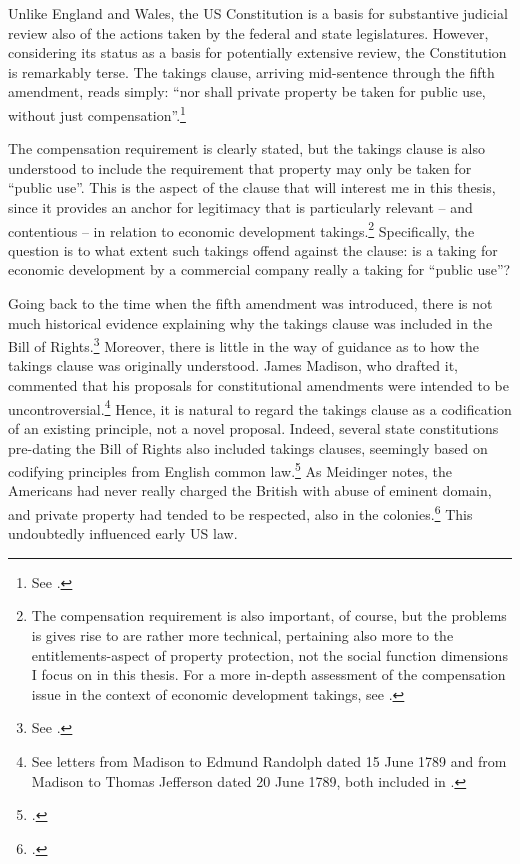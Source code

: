 Unlike England and Wales, the US Constitution is a basis for substantive judicial review also of the actions taken by the federal and state legislatures. However, considering its status as a basis for potentially extensive review, the Constitution is remarkably terse. The takings clause, arriving mid-sentence through the fifth amendment, reads simply: ``nor shall private property be taken for public use, without just compensation''.\footnote{See \cite{us}.}

The compensation requirement is clearly stated, but the takings clause is also understood to include the requirement that property may only be taken for ``public use''. This is the aspect of the clause that will interest me in this thesis, since it provides an anchor for legitimacy that is particularly relevant -- and contentious -- in relation to economic development takings.\footnote{The compensation requirement is also important, of course, but the problems is gives rise to are rather more technical, pertaining also more to the entitlements-aspect of property protection, not the social function dimensions I focus on in this thesis. For a more in-depth assessment of the compensation issue in the context of economic development takings, see \cite{dyrkolbotn15}.}
Specifically, the question is to what extent such takings offend against the clause: is a taking for economic development by a commercial company really a taking for ``public use''?

Going back to the time when the fifth amendment was introduced, there is not much historical evidence explaining why the takings clause was included in the Bill of Rights.\footnote{See \cite{fifth}.} Moreover, there is little in the way of guidance as to how the takings clause was originally understood. James Madison, who drafted it, commented that his proposals for constitutional amendments were intended to be uncontroversial.\footnote{See letters from Madison to Edmund Randolph dated 15 June 1789 and from Madison to Thomas Jefferson dated 20 June 1789, both included in \cite{madison79}.} Hence, it is natural to regard the takings clause as a codification of an existing principle, not a novel proposal. Indeed, several state constitutions pre-dating the Bill of Rights also included takings clauses, seemingly based on codifying principles from English common law.\footcite[See][299]{johnson11} As Meidinger notes, the Americans had never really charged the British with abuse of eminent domain, and private property had tended to be respected, also in the colonies.\footcite[17]{meidinger80} This undoubtedly influenced early US law.

